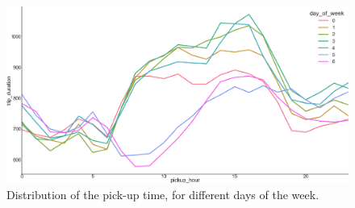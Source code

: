 \documentclass[a4paper]{article}
\begin{document}
\begin{figure}
    \centering
    \includegraphics[width=\linewidth]{pickup_hour_vs_trip_duration}
    \caption{Distribution of the pick-up time, for different days of the week.}
    \label{pickup_hour}
\end{figure}
\end{document}
